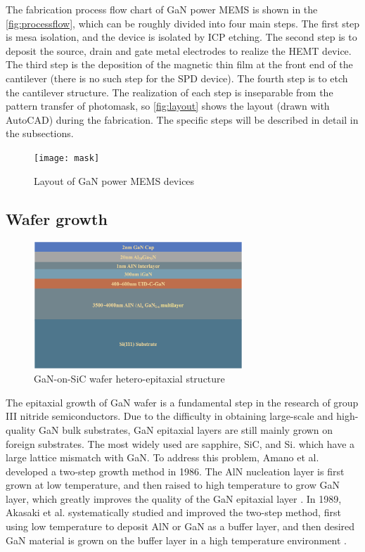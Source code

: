 The fabrication process flow chart of GaN power MEMS is shown in the \autoref{fig:processflow}, which can be roughly divided into four main steps. The first step is mesa isolation, and the device is isolated by ICP etching. The second step is to deposit the source, drain and gate metal electrodes to realize the HEMT device. The third step is the deposition of the magnetic thin film at the front end of the cantilever (there is no such step for the SPD device). The fourth step is to etch the cantilever structure. The realization of each step is inseparable from the pattern transfer of photomask, so \autoref{fig:layout} shows the layout (drawn with AutoCAD) during the fabrication. The specific steps will be described in detail in the subsections.

\begin{figure}[H] 
\centering    
\texttt{[image: mask]}
\caption[Layout of GaN power MEMS devices]{Layout  of GaN power MEMS devices}
\label{fig:layout}
\end{figure}


\subsection{Wafer growth}

\begin{figure}[H] 
\centering    
\includegraphics[width=0.7\textwidth]{structure}
\caption[GaN-on-SiC wafer hetero-epitaxial structure]{GaN-on-SiC wafer hetero-epitaxial structure}
\label{fig:structure}
\end{figure}


The  epitaxial growth  of GaN wafer  is a fundamental step in the research of group III nitride semiconductors. Due to the difficulty in obtaining large-scale and high-quality GaN bulk substrates, GaN epitaxial layers are still mainly grown on foreign substrates. The most widely used are sapphire, SiC, and Si. which have a large lattice mismatch  with GaN. To address this problem, Amano et al. developed a two-step growth method in 1986. The AlN nucleation layer is first grown at low temperature, and then raised to high temperature to grow GaN layer, which greatly improves the quality of the GaN epitaxial layer \cite{amano1986metalorganic}. In 1989, Akasaki et al. systematically studied and improved the two-step method, first using low temperature to deposit AlN or GaN as a buffer layer, and then desired GaN material is grown on the buffer layer in a high temperature environment \cite{akasaki1989effects}.

